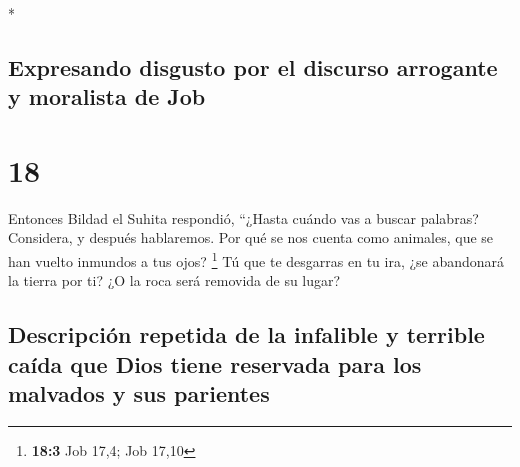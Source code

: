 \begin{paracol}{2}
\begin{otherlanguage}{english}
\end{otherlanguage}

\switchcolumn[0]*

\hypertarget{expresando-disgusto-por-el-discurso-arrogante-y-moralista-de-job}{%
\subsection{Expresando disgusto por el discurso arrogante y moralista de
Job}\label{expresando-disgusto-por-el-discurso-arrogante-y-moralista-de-job}}

\hypertarget{section-34}{%
\section{18}\label{section-34}}

 Entonces Bildad el Suhita respondió, 
``¿Hasta cuándo vas a buscar palabras? Considera, y después hablaremos.
 Por qué se nos cuenta como animales, que se han vuelto
inmundos a tus ojos? \footnote{\textbf{18:3} Job 17,4; Job 17,10}
 Tú que te desgarras en tu ira, ¿se abandonará la tierra
por ti? ¿O la roca será removida de su lugar?

\hypertarget{descripciuxf3n-repetida-de-la-infalible-y-terrible-cauxedda-que-dios-tiene-reservada-para-los-malvados-y-sus-parientes}{%
\subsection{Descripción repetida de la infalible y terrible caída que
Dios tiene reservada para los malvados y sus
parientes}\label{descripciuxf3n-repetida-de-la-infalible-y-terrible-cauxedda-que-dios-tiene-reservada-para-los-malvados-y-sus-parientes}}


\end{paracol}
